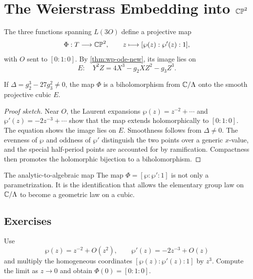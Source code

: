 \chapter{The Weierstrass Embedding into \texorpdfstring{\(\mathbb{CP}^2\)}{CP2}}
\label{ch:weierstrass-embedding}

The three functions spanning \(L(3O)\) define a projective map
\[
  \Phi:T\longrightarrow\mathbb{CP}^2,\qquad
  z\longmapsto[\wp(z):\wp'(z):1],
\]
with \(O\) sent to \([0:1:0]\).  By \cref{thm:wp-ode-new}, its image lies on
\[
  E:\quad Y^2Z=4X^3-g_2XZ^2-g_3Z^3.
\]

\begin{theorem}
\label{thm:wp-embedding-new}
If \(\Delta=g_2^3-27g_3^2\ne0\), the map \(\Phi\) is a biholomorphism from
\(\mathbb{C}/\Lambda\) onto the smooth projective cubic \(E\).
\end{theorem}

\begin{proof}[Proof sketch]
Near \(O\), the Laurent expansions
\(\wp(z)=z^{-2}+\cdots\) and \(\wp'(z)=-2z^{-3}+\cdots\) show that the map
extends holomorphically to \([0:1:0]\).  The equation shows the image lies on
\(E\).  Smoothness follows from \(\Delta\ne0\).  The evenness of \(\wp\) and
oddness of \(\wp'\) distinguish the two points over a generic \(x\)-value, and
the special half-period points are accounted for by ramification.  Compactness
then promotes the holomorphic bijection to a biholomorphism.
\end{proof}

\begin{keyidea}{The analytic-to-algebraic map}
The map \(\Phi=[\wp:\wp':1]\) is not only a parametrization.  It is the
identification that allows the elementary group law on \(\mathbb{C}/\Lambda\) to become
a geometric law on a cubic.
\end{keyidea}

\section*{Exercises}

\begin{exercise}
Use
\[
  \wp(z)=z^{-2}+O(z^2),\qquad \wp'(z)=-2z^{-3}+O(z)
\]
and multiply the homogeneous coordinates
\([\wp(z):\wp'(z):1]\) by \(z^3\).  Compute the limit as \(z\to0\) and obtain
\(\Phi(0)=[0:1:0]\).
\end{exercise}

